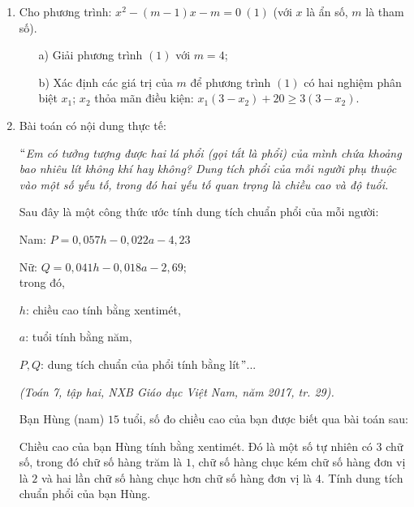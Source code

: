 \begin{ex}%
\hfill
\begin{enumerate}
\item Cho phương trình: $x^2-(m-1)x-m=0 \hspace{3pt} (1)$ (với $x$ là ẩn số, $m$ là tham số).
\begin{enumerate}
\item[a)] Giải phương trình $(1)$ với $m=4$;
\item[b)] Xác định các giá trị của $m$ để phương trình $(1)$ có hai nghiệm phân biệt $x_1$; $x_2$ thỏa mãn điều kiện: $x_1(3-x_2)+20 \ge 3(3-x_2)$.
\end{enumerate}
\item Bài toán có nội dung thực tế:
\par \it $``$Em có tưởng tượng được hai lá phổi (gọi tắt là phổi) của mình chứa khoảng bao nhiêu lít không khí hay không? Dung tích phổi của mỗi người phụ thuộc vào một số yếu tố, trong đó hai yếu tố quan trọng là chiều cao và độ tuổi.
\par Sau đây là một công thức ước tính dung tích chuẩn phổi của mỗi người:
\par Nam: $P=0,057h-0,022a-4,23$
\par Nữ: $Q=0,041h-0,018a-2,69;$\\
trong đó,
\par $h$: chiều cao tính bằng xentimét,
\par $a$: tuổi tính bằng năm,
\par $P, Q$: dung tích chuẩn của phổi tính bằng lít$"$...
\begin{flushright}
\emph{({\it Toán 7}, tập hai, NXB Giáo dục Việt Nam, năm 2017, tr. 29).}
\end{flushright}
\rm Bạn Hùng (nam) $15$ tuổi, số đo chiều cao của bạn được biết qua bài toán sau:
\par Chiều cao của bạn Hùng tính bằng xentimét. Đó là một số tự nhiên có $3$ chữ số, trong đó chữ số hàng trăm là $1$, chữ số hàng chục kém chữ số hàng đơn vị là $2$ và hai lần chữ số hàng chục hơn chữ số hàng đơn vị là $4$. Tính dung tích chuẩn phổi của bạn Hùng.
\end{enumerate}
\end{ex}
